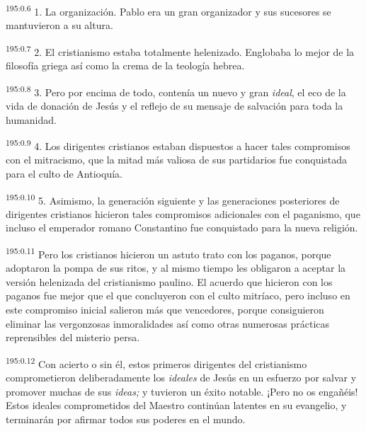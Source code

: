 \par 
\textsuperscript{195:0.6} 1. La organización. Pablo era un gran organizador y sus sucesores se mantuvieron a su altura.

\par 
\textsuperscript{195:0.7} 2. El cristianismo estaba totalmente helenizado. Englobaba lo mejor de la filosofía griega así como la crema de la teología hebrea.

\par 
\textsuperscript{195:0.8} 3. Pero por encima de todo, contenía un nuevo y gran \textit{ideal}, el eco de la vida de donación de Jesús y el reflejo de su mensaje de salvación para toda la humanidad.

\par 
\textsuperscript{195:0.9} 4. Los dirigentes cristianos estaban dispuestos a hacer tales compromisos con el mitracismo, que la mitad más valiosa de sus partidarios fue conquistada para el culto de Antioquía.

\par 
\textsuperscript{195:0.10} 5. Asimismo, la generación siguiente y las generaciones posteriores de dirigentes cristianos hicieron tales compromisos adicionales con el paganismo, que incluso el emperador romano Constantino fue conquistado para la nueva religión.

\par 
\textsuperscript{195:0.11} Pero los cristianos hicieron un astuto trato con los paganos, porque adoptaron la pompa de sus ritos, y al mismo tiempo les obligaron a aceptar la versión helenizada del cristianismo paulino. El acuerdo que hicieron con los paganos fue mejor que el que concluyeron con el culto mitríaco, pero incluso en este compromiso inicial salieron más que vencedores, porque consiguieron eliminar las vergonzosas inmoralidades así como otras numerosas prácticas reprensibles del misterio persa.

\par 
\textsuperscript{195:0.12} Con acierto o sin él, estos primeros dirigentes del cristianismo comprometieron deliberadamente los \textit{ideales} de Jesús en un esfuerzo por salvar y promover muchas de sus \textit{ideas;} y tuvieron un éxito notable. ¡Pero no os engañéis! Estos ideales comprometidos del Maestro continúan latentes en su evangelio, y terminarán por afirmar todos sus poderes en el mundo.

